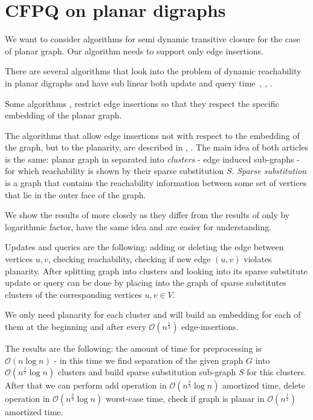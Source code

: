 \section{CFPQ on planar digraphs}

We want to consider algorithms for semi dynamic transitive closure for the case of planar graph. Our algorithm needs to support only edge insertions.

There are several algorithms that look into the problem of dynamic reachability in planar digraphs and have sub linear both update and query time~\cite{subramanian1993fully}, \cite{karczmarz2018data}, \cite{kao2008encyclopedia}. 

Some algorithms \cite{diks2007dynamic}, \cite{karczmarz2018data} restrict edge insertions so that they respect the specific embedding of the planar graph. 


The algorithms that allow edge insertions not with respect to the embedding of the graph, but to the planarity, are described in \cite{subramanian1993fully}, \cite{galil1999fully}. The main idea of both articles is the same: planar graph in separated into \textit{clusters} - edge induced sub-graphs - for which reachability is shown by their sparse substitution $S$. \textit{Sparse substitution} is a graph that contains the reachability information between some set of vertices that lie in the outer face of the graph.

We show the results of \cite{subramanian1993fully} more closely as they differ from the results of \cite{galil1999fully} only by logarithmic factor, have the same idea and are easier for understanding. 

Updates and queries are the following: adding or deleting the edge between vertices $u, v$, checking reachability, checking if new edge $(u, v)$ violates planarity. After splitting graph into clusters and looking into its sparse substitute update or query can be done by placing into the graph of sparse substitutes clusters of the corresponding vertices $u, v \in V$. 

We only need planarity for each cluster and will build an embedding for each of them at the beginning and after every $\mathcal{O}(n^{\frac{1}{3}})$ edge-insertions. 

The results are the following: the amount of time for preprocessing is $\mathcal{O}(n \log n)$ - in this time we find separation of the given graph $G$ into $\mathcal{O}(n^{\frac{1}{3}} \log n)$ clusters and build sparse substitution sub-graph $S$ for this clusters. After that we can perform add operation in $\mathcal{O}(n^{\frac{2}{3}} \log n)$ amortized time, delete operation in $\mathcal{O}(n^{\frac{2}{3}} \log n)$ worst-case time, check if graph is planar in $\mathcal{O}(n^{\frac{1}{2}})$ amortized time. 

